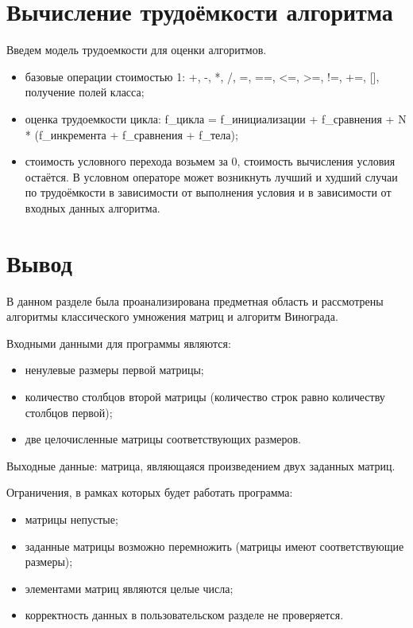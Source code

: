 \documentclass[12pt]{report}
\begin{document}
	\section{Вычисление трудоёмкости алгоритма}
	Введем модель трудоемкости для оценки алгоритмов.
	\begin{itemize}
		\item базовые операции стоимостью 1: +, -, *, /, =, ==, <=, >=, !=, +=, [], получение полей класса;
		\item оценка трудоемкости цикла: f\_цикла = f\_инициализации + f\_сравнения + N * (f\_инкремента + f\_сравнения + f\_тела);
		\item стоимость условного перехода возьмем за 0, стоимость вычисления условия остаётся. В условном операторе может возникнуть лучший и худший случаи по трудоёмкости в зависимости от выполнения условия и в зависимости от входных данных алгоритма.
	\end{itemize}
	
	\section{Вывод}
	В данном разделе была проанализирована предметная область и рассмотрены алгоритмы классического умножения матриц и алгоритм Винограда.
	
	Входными данными для программы являются:
	
	\begin{itemize}
		\item ненулевые размеры первой матрицы;
		\item количество столбцов второй матрицы (количество строк равно количеству столбцов первой);
		\item две целочисленные матрицы соответствующих размеров.
	\end{itemize}
	
	Выходные данные: матрица, являющаяся произведением двух заданных матриц.
	
	Ограничения, в рамках которых будет работать программа:
	
	\begin{itemize}
		\item матрицы непустые;
		\item заданные матрицы возможно перемножить (матрицы имеют соответствующие размеры);
		\item элементами матриц являются целые числа;
		\item корректность данных в пользовательском разделе не проверяется.
	\end{itemize}
	
\end{document}
